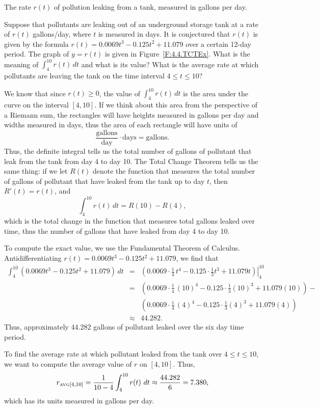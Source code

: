 \begin{marginfigure} %
\caption{The rate $r(t)$ of pollution leaking from a tank, measured in gallons per day.} \label{F:4.4.TCTEx}
\end{marginfigure} 

\begin{example} \label{eg:4.7.1} %
Suppose that pollutants are leaking out of an underground storage tank at a rate of $r(t)$ gallons/day, where $t$ is measured in days.  It is conjectured that $r(t)$ is given by the formula $r(t) = 0.0069t^3 -0.125t^2+11.079$ over a certain 12-day period.  The graph of $y=r(t)$ is given in Figure~\ref{F:4.4.TCTEx}.  What is the meaning of $\int_4^{10} r(t) \, dt$ and what is its value?  What is the average rate at which pollutants are leaving the tank on the time interval $4 \le t \le 10$?

\solution We know that since $r(t) \ge 0$, the value of $\int_4^{10} r(t) \, dt$ is the area under the curve on the interval $[4,10]$.  If we think about this area from the perspective of a Riemann sum, the rectangles will have heights measured in gallons per day and widths measured in days, thus the area of each rectangle will have units of
\[ \frac{\mbox{gallons}}{\mbox{day}} \cdot \mbox{days} = \mbox{gallons}. \]
Thus, the definite integral tells us the total number of gallons of pollutant that leak from the tank from day 4 to day 10.  The Total Change Theorem tells us the same thing:  if we let $R(t)$ denote the function that measures the total number of gallons of pollutant that have leaked from the tank up to day $t$, then $R'(t) = r(t)$, and 
\[ \int_4^{10} r(t) \, dt = R(10) - R(4), \]
which is the total change in the function that measures total gallons leaked over time, thus the number of gallons that have leaked from day 4 to day 10.

To compute the exact value, we use the Fundamental Theorem of Calculus.  Antidifferentiating $r(t) = 0.0069t^3 -0.125t^2+11.079$, we find that
\begin{eqnarray*}
\int_4^{10} (0.0069t^3 -0.125t^2+11.079) \, dt & = & \left. \left( 0.0069 \cdot \frac{1}{4} \, t^4 - 0.125 \cdot \frac{1}{3} t^3 + 11.079t \right) \right|_4^{10} \\
& = & \left( 0.0069 \cdot \frac{1}{4} \, (10)^4 - 0.125 \cdot \frac{1}{3} (10)^3 + 11.079(10) \right) - \\
& \ &  \left( 0.0069 \cdot \frac{1}{4} \, (4)^4 - 0.125 \cdot \frac{1}{3} (4)^3 + 11.079(4) \right) \\
& \approx & 44.282. 
\end{eqnarray*}
Thus, approximately 44.282 gallons of pollutant leaked over the six day time period.

To find the average rate at which pollutant leaked from the tank over $4 \le t \le 10$, we want to compute the average value of $r$ on $[4,10]$.  Thus,
\[ r_{\mbox{\tiny{AVG}}[4,10]} = \frac{1}{10-4} \int_4^{10} r(t) \ dt \approx \frac{44.282}{6} = 7.380, \]
which has its units measured in gallons per day.
\end{example}